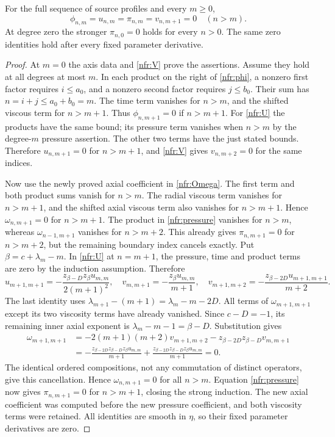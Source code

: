 \begin{theorem}\label{nfr:support}
For the full sequence of source profiles and every \(m\geq0\),
\[
 \phi_{n,m}=u_{n,m}=\pi_{n,m}=v_{n,m+1}=0\quad(n>m).
\]
At degree zero the stronger \(\pi_{n,0}=0\) holds for every \(n>0\).
The same zero identities hold after every fixed parameter derivative.
\end{theorem}
\begin{proof}
At \(m=0\) the axis data and \eqref{nfr:V} prove the assertions.
Assume they hold at all degrees at most \(m\). In each product on
the right of \eqref{nfr:phi}, a nonzero first factor requires
\(i\leq a_0\), and a nonzero second factor requires \(j\leq b_0\).
Their sum has \(n=i+j\leq a_0+b_0=m\). The time term vanishes
for \(n>m\), and the shifted viscous term for \(n>m+1\).
Thus \(\phi_{n,m+1}=0\) if \(n>m+1\).
For \eqref{nfr:U} the products have the same bound; its pressure term
vanishes when \(n>m\) by the degree-\(m\) pressure assertion.
The other two terms have the just stated bounds. Therefore
\(u_{n,m+1}=0\) for \(n>m+1\), and \eqref{nfr:V} gives
\(v_{n,m+2}=0\) for the same indices.

Now use the newly proved axial coefficient in \eqref{nfr:Omega}.
The first term and both product sums vanish for \(n>m\).
The radial viscous term vanishes for \(n>m+1\), and the shifted
axial viscous term also vanishes for \(n>m+1\).
Hence \(\omega_{n,m+1}=0\) for \(n>m+1\).
The product in \eqref{nfr:pressure} vanishes for \(n>m\), whereas
\(\omega_{n-1,m+1}\) vanishes for \(n>m+2\).
This already gives \(\pi_{n,m+1}=0\) for \(n>m+2\), but the
remaining boundary index cancels exactly. Put
\(\beta=c+\lambda_m-m\). In \eqref{nfr:U} at \(n=m+1\),
the pressure, time and product terms are zero by the induction assumption.
Therefore
\[
 u_{m+1,m+1}=-\frac{z_{\beta-D}z_\beta u_{m,m}}{2(m+1)^2},\quad
 v_{m,m+1}=-\frac{z_\beta u_{m,m}}{m+1},\quad
 v_{m+1,m+2}=-\frac{z_{\beta-2D}u_{m+1,m+1}}{m+2}.
\]
The last identity uses \(\lambda_{m+1}-(m+1)=\lambda_m-m-2D\).
All terms of \(\omega_{m+1,m+1}\) except its two viscosity terms
have already vanished. Since \(c-D=-1\), its remaining inner
axial exponent is \(\lambda_m-m-1=\beta-D\). Substitution gives
\[
 \begin{split}
 \omega_{m+1,m+1}
 &=-2(m+1)(m+2)v_{m+1,m+2}
       -z_{\beta-2D}z_{\beta-D}v_{m,m+1}\\
 &=-\frac{z_{\beta-2D}z_{\beta-D}z_\beta u_{m,m}}{m+1}
   +\frac{z_{\beta-2D}z_{\beta-D}z_\beta u_{m,m}}{m+1}=0.
 \end{split}
\]
The identical ordered compositions, not any commutation of distinct
operators, give this cancellation. Hence \(\omega_{n,m+1}=0\)
for all \(n>m\). Equation \eqref{nfr:pressure} now gives
\(\pi_{n,m+1}=0\) for \(n>m+1\), closing the strong induction.
The new axial coefficient was computed before the new pressure coefficient,
and both viscosity terms were retained. All identities are smooth in
\(\eta\), so their fixed parameter derivatives are zero.
\end{proof}

